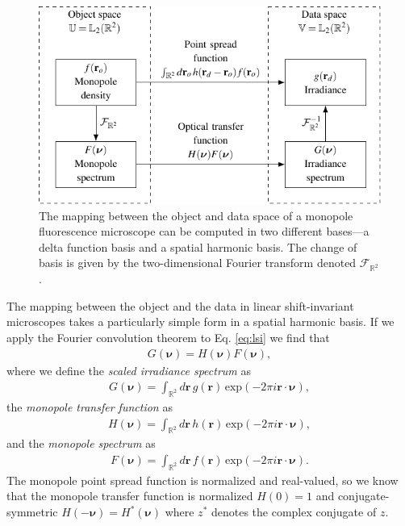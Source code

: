 \documentclass[]{osa-article}
\providecommand{\mb}[1]{\mathbf{#1}}
\providecommand{\mbb}[1]{\mathbb{#1}}
\providecommand{\bs}[1]{\boldsymbol{#1}}
\providecommand{\bv}{\bs{\nu}}
\begin{document}
\begin{figure}
  \centering
  \includegraphics[scale=1.0]{../figures/monopole-block/monopole-block.pdf}
  \caption{The mapping between the object and data space of a monopole
    fluorescence microscope can be computed in two different bases---a delta
    function basis and a spatial harmonic basis. The change of basis is given by
    the two-dimensional Fourier transform denoted $\mathcal{F}_{\mbb{R}^2}$.}
     \label{fig:monopole-block}      
\end{figure}

The mapping between the object and the data in linear shift-invariant
microscopes takes a particularly simple form in a spatial harmonic basis. If we
apply the Fourier convolution theorem to Eq. \ref{eq:lsi} we find that
\begin{align}
  G(\bv) = H(\bv)F(\bv),\label{eq:freq}
\end{align}
where we define the \textit{scaled irradiance spectrum} as
\begin{align}
  G(\bv) = \int_{\mbb{R}^2}d\mb{r}\, g(\mb{r})\, \text{exp}(-2\pi i\mb{r}\cdot\bv),
\end{align}
the \textit{monopole transfer function} as
\begin{align}
  H(\bv) = \int_{\mbb{R}^2}d\mb{r}\, h(\mb{r})\, \text{exp}(-2\pi i\mb{r}\cdot\bv),\label{eq:otf}
\end{align}
and the \textit{monopole spectrum} as
\begin{align}
    F(\bv) = \int_{\mbb{R}^2}d\mb{r}\, f(\mb{r})\, \text{exp}(-2\pi i\mb{r}\cdot\bv).
\end{align}
The monopole point spread function is normalized and real-valued, so we know
that the monopole transfer function is normalized $H(0) = 1$ and
conjugate-symmetric $H(-\bv) = H^*(\bv)$ where $z^*$ denotes the complex
conjugate of $z$.
\end{document}
